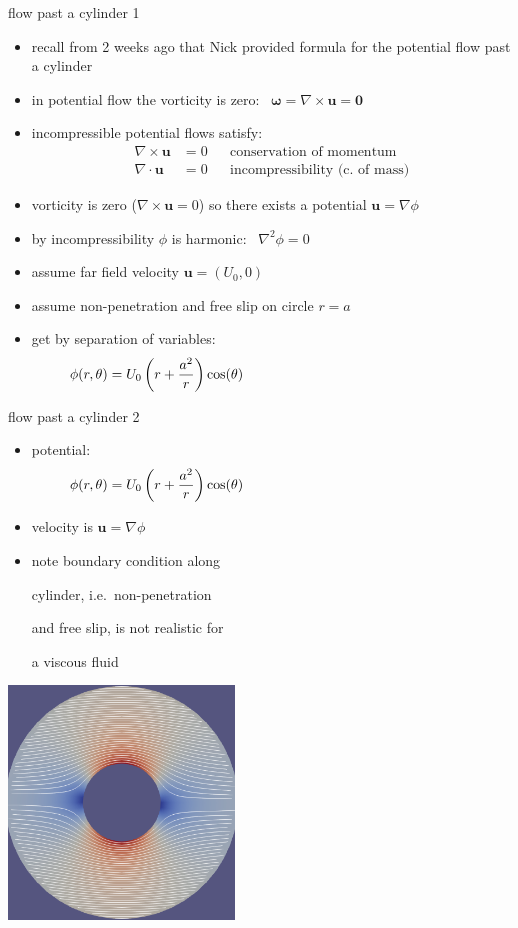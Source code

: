 \documentclass[10pt,hyperref]{beamer}
\newcommand{\bu}{\mathbf{u}}
\newcommand{\bzero}{\bm{0}}
\newcommand{\grad}{\nabla}
\newcommand{\Div}{\nabla\cdot}
\newcommand{\Curl}{\nabla\times}
\begin{document}
\begin{frame}{flow past a cylinder 1}

\begin{itemize}
\item recall from 2 weeks ago that Nick provided formula for the potential flow past a cylinder
\item in potential flow the vorticity is zero: \, $\bm{\omega}=\Curl\bu=\bzero$
\item incompressible potential flows satisfy:
\begin{align*}
\Curl \bu &= 0 & &\text{conservation of momentum} \\
\Div \bu &= 0 & &\text{incompressibility (c.~of mass)}
\end{align*}
\item vorticity is zero ($\Curl\bu=0$) so there exists a potential $\bu = \grad \phi$
\item by incompressibility $\phi$ is harmonic: \, $\grad^2 \phi = 0$
\item assume far field velocity $\bu=(U_0,0)$
\item assume non-penetration and free slip on circle $r=a$
\item get by separation of variables:
	$$\phi(r,\theta) = U_0 \left(r + \frac{a^2}{r}\right) \cos(\theta) \hspace{2.3in}$$
\end{itemize}
\end{frame}


\begin{frame}{flow past a cylinder 2}

\begin{itemize}
\item potential:
	$$\phi(r,\theta) = U_0 \left(r + \frac{a^2}{r}\right) \cos(\theta) \hspace{2.3in}$$
\item velocity is $\bu = \grad \phi$
\item note boundary condition along

cylinder, i.e.~non-penetration

and free slip, is not realistic for

a viscous fluid
\end{itemize}

\vspace{-25mm}
\hfill \includegraphics[width=0.45\textwidth]{figs/flowcyl.png}
\end{frame}
\end{document}

